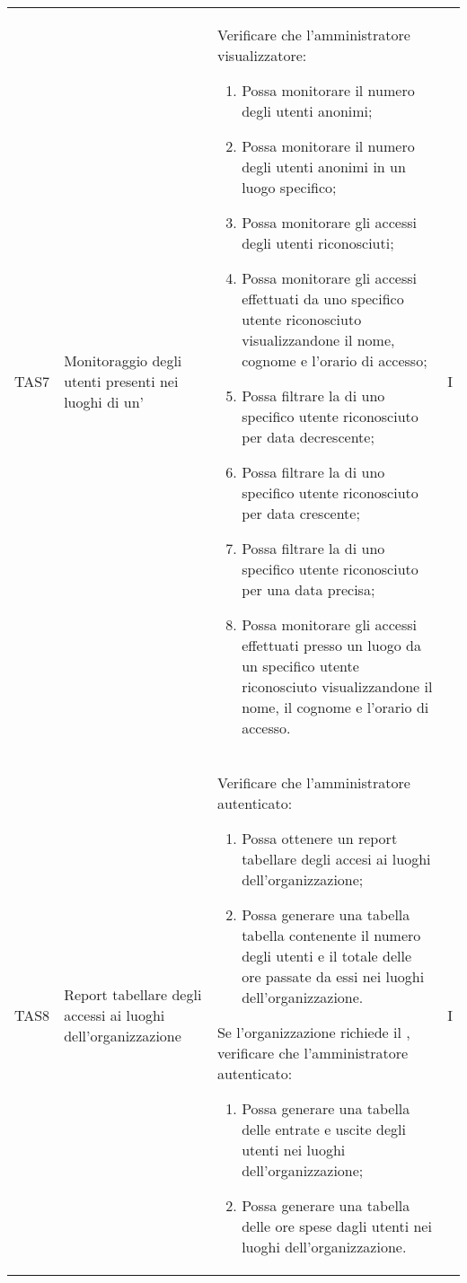 {\begin{longtable}{ c  C{2.5cm}  C{10cm} C{1cm}}
TAS7 & Monitoraggio degli utenti presenti nei luoghi di un' &
Verificare che l'amministratore visualizzatore:
\begin{enumerate}[resume]
    \item Possa monitorare il numero degli utenti anonimi;
    \item Possa monitorare il numero degli utenti anonimi in un luogo specifico;
    \item Possa monitorare gli accessi degli utenti riconosciuti;
    \item Possa monitorare gli accessi effettuati da uno specifico utente riconosciuto visualizzandone il nome, cognome e l'orario di accesso;
    \item Possa filtrare la  di uno specifico utente riconosciuto per data decrescente;
    \item Possa filtrare la  di uno specifico utente riconosciuto per data crescente;
    \item Possa filtrare la  di uno specifico utente riconosciuto per una data precisa;
    \item Possa monitorare gli accessi effettuati presso un luogo da un specifico utente riconosciuto visualizzandone il nome, il cognome e l’orario di accesso.
\end{enumerate} & I \\

TAS8 & Report tabellare degli accessi ai luoghi dell'organizzazione &
Verificare che l'amministratore autenticato:
\begin{enumerate}
    \item Possa ottenere un report tabellare degli accesi ai luoghi dell'organizzazione;
    \item Possa generare una tabella tabella contenente il numero degli utenti e il totale delle ore passate da essi nei luoghi dell’organizzazione.
\end{enumerate}
Se l'organizzazione richiede il , verificare che l'amministratore autenticato:
\begin{enumerate}[resume]
    \item Possa generare una tabella delle entrate e uscite degli utenti nei luoghi dell'organizzazione;
    \item Possa generare una tabella delle ore spese dagli utenti nei luoghi dell'organizzazione.
\end{enumerate} & I \\


\end{longtable}}
